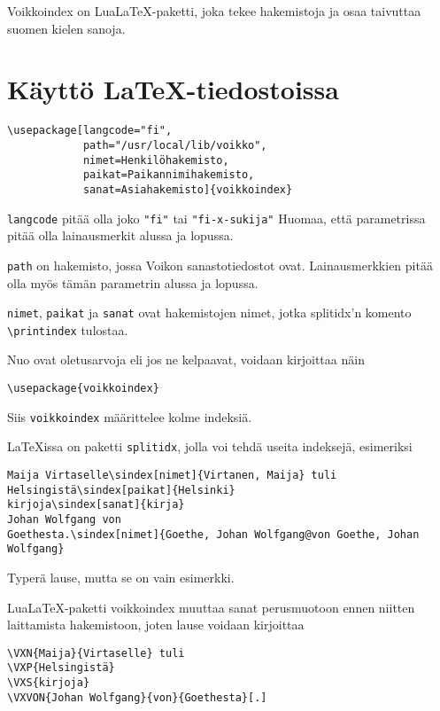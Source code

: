 \documentclass[12pt]{article}
\begin{document}
\pagestyle{fancy}
\setlength{\parindent}{0pt}
\setlength{\parskip}{1ex plus 0.5ex minus 0.2ex}

Voikkoindex on LuaLaTeX-paketti, joka tekee hakemistoja ja osaa
taivuttaa suomen kielen sanoja.


\section*{Käyttö LaTeX-tiedostoissa}

\begin{verbatim}
\usepackage[langcode="fi",
            path="/usr/local/lib/voikko",
            nimet=Henkilöhakemisto,
            paikat=Paikannimihakemisto,
            sanat=Asiahakemisto]{voikkoindex}
\end{verbatim}

\verb=langcode= pitää olla joko \verb="fi"= tai \verb="fi-x-sukija"=
Huomaa, että parametrissa pitää olla lainausmerkit alussa ja lopussa.

\verb=path= on hakemisto, jossa Voikon sanastotiedostot ovat.
Lainausmerkkien pitää olla myös tämän parametrin alussa ja lopussa.

\verb=nimet=, \verb=paikat= ja \verb=sanat= ovat hakemistojen nimet,
jotka splitidx'n komento \verb=\printindex= tulostaa.

Nuo ovat oletusarvoja eli jos ne kelpaavat, voidaan kirjoittaa näin

\begin{verbatim}
\usepackage{voikkoindex}
\end{verbatim}

Siis \verb=voikkoindex= määrittelee kolme indeksiä.


\bigskip
LaTeXissa on paketti \verb=splitidx=, jolla voi tehdä useita
indeksejä, esimeriksi

\begin{verbatim}
Maija Virtaselle\sindex[nimet]{Virtanen, Maija} tuli
Helsingistä\sindex[paikat]{Helsinki}
kirjoja\sindex[sanat]{kirja}
Johan Wolfgang von
Goethesta.\sindex[nimet]{Goethe, Johan Wolfgang@von Goethe, Johan Wolfgang}
\end{verbatim}

Typerä lause, mutta se on vain esimerkki.

LuaLaTeX-paketti voikkoindex muuttaa sanat perusmuotoon ennen niitten
laittamista hakemistoon, joten lause voidaan kirjoittaa

\begin{verbatim}
\VXN{Maija}{Virtaselle} tuli
\VXP{Helsingistä}
\VXS{kirjoja}
\VXVON{Johan Wolfgang}{von}{Goethesta}[.]
\end{verbatim}
\end{document}
